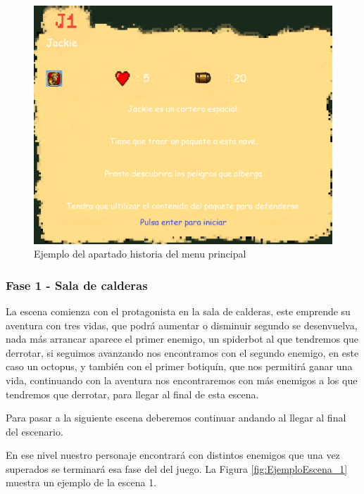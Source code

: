 \begin{figure}[H]
	\centering
	\includegraphics[scale=0.50]{imagenes/EjemploMenuHistoria.png}
	\caption{\label{fig:EjemploMenuHistoria}Ejemplo del apartado historia del menu principal}
\end{figure}

\subsubsection{Fase 1 - Sala de calderas}
La escena comienza con el protagonista en la sala de calderas, este emprende su aventura con tres vidas, que podrá aumentar o disminuir segundo se desenvuelva, nada más arrancar aparece el primer enemigo, un spiderbot al que tendremos que derrotar, si seguimos avanzando nos encontramos con el segundo enemigo, en este caso un octopus, y también con el primer botiquín, que nos permitirá ganar una vida, continuando con la aventura nos encontraremos con más enemigos a los que tendremos que derrotar, para llegar al final de esta escena. 

Para pasar a la siguiente escena deberemos continuar andando al llegar al final del escenario.  

En ese nivel nuestro personaje encontrará con distintos enemigos que una vez superados se terminará esa fase del del juego. La Figura \ref{fig:EjemploEscena_1} muestra un ejemplo de la escena 1. 

